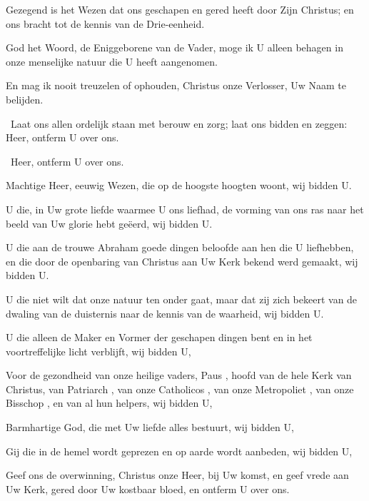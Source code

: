 \documentclass[12pt,twoside,a5paper]{article}
\begin{document}
\begin{halfparskip}

  Gezegend is het Wezen dat ons geschapen en gered heeft door Zijn Christus; en ons bracht tot de kennis van de Drie-eenheid.

  God het Woord, de Eniggeborene van de Vader, moge ik U alleen behagen in onze menselijke natuur die U heeft aangenomen.

  En mag ik nooit treuzelen of ophouden, Christus onze Verlosser, Uw Naam te belijden.
\end{halfparskip}



\begin{halfparskip}
  \dd~Laat ons allen ordelijk staan met berouw en zorg; laat ons bidden en zeggen: Heer, ontferm U over ons.

  \rr~Heer, ontferm U over ons. 

  Machtige Heer, eeuwig Wezen, die op de hoogste hoogten woont, wij bidden U.

  U die, in Uw grote liefde waarmee U ons liefhad, de vorming van ons ras naar het beeld van Uw glorie hebt geëerd, wij bidden U.

  U die aan de trouwe Abraham goede dingen beloofde aan hen die U liefhebben, en die door de openbaring van Christus aan Uw Kerk bekend werd gemaakt, wij bidden U.

  U die niet wilt dat onze natuur ten onder gaat, maar dat zij zich bekeert van de dwaling van de duisternis naar de kennis van de waarheid, wij bidden U.

  U die alleen de Maker en Vormer der geschapen dingen bent en in het voortreffelijke licht verblijft, wij bidden U,

  Voor de gezondheid van onze heilige vaders, Paus \NN , hoofd van de hele Kerk van Christus, van Patriarch \NN , van onze Catholicos \NN , van onze Metropoliet \NN , van onze Bisschop \NN , en van al hun helpers, wij bidden U,

  Barmhartige God, die met Uw liefde alles bestuurt, wij bidden U,

  Gij die in de hemel wordt geprezen en op aarde wordt aanbeden, wij bidden U,

  Geef ons de overwinning, Christus onze Heer, bij Uw komst, en geef vrede aan Uw Kerk, gered door Uw kostbaar bloed, en ontferm U over ons.


\end{halfparskip}
\end{document}
